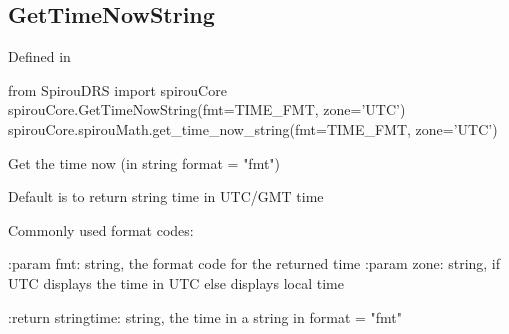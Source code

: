 \noindent\begin{minipage}{\textwidth}
\subsection{GetTimeNowString}

Defined in \spirouCore{}

\begin{pythonbox}
from SpirouDRS import spirouCore
spirouCore.GetTimeNowString(fmt=TIME_FMT, zone='UTC')
spirouCore.spirouMath.get_time_now_string(fmt=TIME_FMT, zone='UTC')
\end{pythonbox}

\begin{pythondocstring}
Get the time now (in string format = "fmt")

Default is to return string time in UTC/GMT time

    Commonly used format codes:



:param fmt: string, the format code for the returned time
:param zone: string, if UTC displays the time in UTC else displays local
             time

:return stringtime: string, the time in a string in format = "fmt"
\end{pythondocstring}
\end{minipage}

